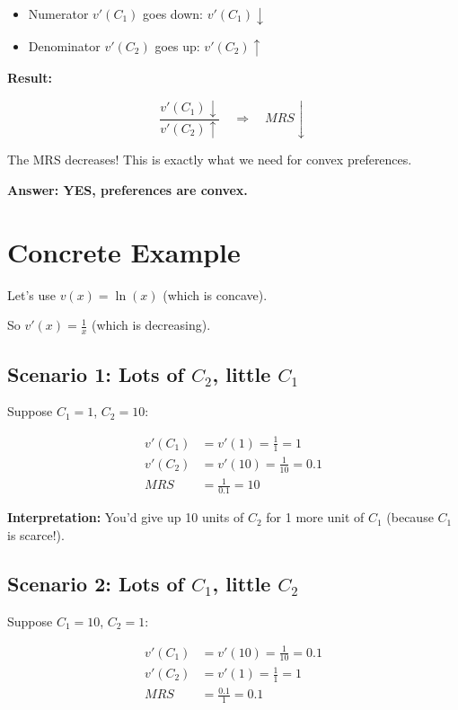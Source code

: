 \documentclass[12pt]{article}
\begin{document}
\begin{itemize}
\item Numerator $v'(C_1)$ goes down: $v'(C_1) \downarrow$
\item Denominator $v'(C_2)$ goes up: $v'(C_2) \uparrow$
\end{itemize}

\begin{tcolorbox}[colback=yellow!20!white,colframe=orange!75!black]
\textbf{Result:}

\[
\frac{v'(C_1) \downarrow}{v'(C_2) \uparrow} \quad \Rightarrow \quad MRS \downarrow
\]

The MRS decreases! This is exactly what we need for convex preferences.

\vspace{0.3cm}

\textbf{Answer: YES, preferences are convex.}
\end{tcolorbox}

\newpage

\section*{Concrete Example}

Let's use $v(x) = \ln(x)$ (which is concave).

So $v'(x) = \frac{1}{x}$ (which is decreasing).

\subsection*{Scenario 1: Lots of $C_2$, little $C_1$}

Suppose $C_1 = 1$, $C_2 = 10$:

\begin{align*}
v'(C_1) &= v'(1) = \frac{1}{1} = 1 \\
v'(C_2) &= v'(10) = \frac{1}{10} = 0.1 \\
MRS &= \frac{1}{0.1} = 10
\end{align*}

\textbf{Interpretation:} You'd give up 10 units of $C_2$ for 1 more unit of $C_1$ (because $C_1$ is scarce!).

\subsection*{Scenario 2: Lots of $C_1$, little $C_2$}

Suppose $C_1 = 10$, $C_2 = 1$:

\begin{align*}
v'(C_1) &= v'(10) = \frac{1}{10} = 0.1 \\
v'(C_2) &= v'(1) = \frac{1}{1} = 1 \\
MRS &= \frac{0.1}{1} = 0.1
\end{align*}
\end{document}
